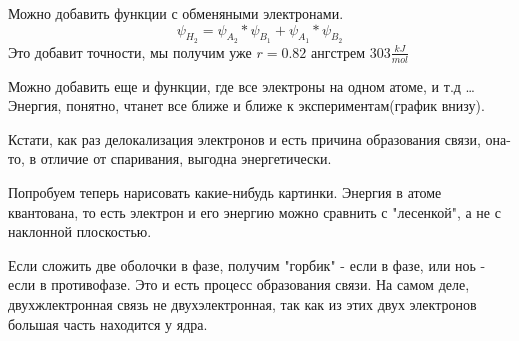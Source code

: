 \documentclass[11pt]{article}
\begin{document}
Можно добавить функции с обменяными электронами.
$$\psi_{H_2} = \psi_{A_2}*\psi_{B_1} + \psi_{A_1}*\psi_{B_2} $$
 Это добавит точности, мы получим уже $r=0.82$ ангстрем $303 \frac{kJ}{mol}$

Можно добавить еще и функции, где все электроны на одном атоме, и т.д \ldots Энергия, понятно, чтанет все ближе и ближе к экспериментам(график внизу).

Кстати, как раз делокализация электронов и есть причина образования связи, она-то, в отличие от спаривания, выгодна энергетически.

Попробуем теперь нарисовать какие-нибудь картинки. Энергия в атоме квантована, то есть электрон и его энергию можно сравнить с "лесенкой",  а не с наклонной плоскостью.

Если сложить две оболочки в фазе, получим "горбик" - если в фазе, или ноь - если в противофазе. Это и есть процесс образования связи. На самом деле, двухжлектронная связь не двухэлектронная, так как из этих двух электронов большая часть находится у ядра.
\end{document}
